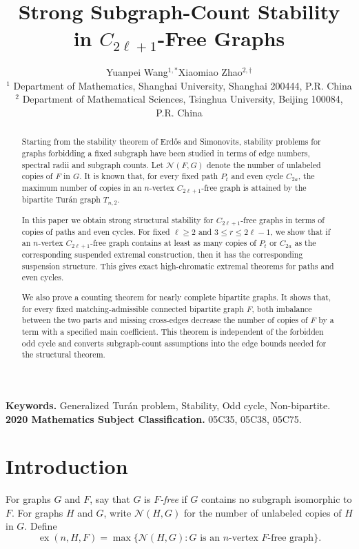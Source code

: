 \documentclass[11pt]{article}
\title{Strong Subgraph-Count Stability in $C_{2\ell+1}$-Free Graphs}
\author{Yuanpei Wang$^{1,*}$\quad Xiaomiao Zhao$^{2,\dagger}$\\[0.5ex]
\small $^1$ Department of Mathematics, Shanghai University, Shanghai 200444, P.R. China\\
\small $^2$ Department of Mathematical Sciences, Tsinghua University, Beijing 100084, P.R. China}
\date{}
\theoremstyle{definition}
\theoremstyle{plain}
\theoremstyle{remark}
\theoremstyle{plain}
\numberwithin{equation}{section}
\DeclareMathOperator{\ex}{ex}
\newcommand{\N}{\mathcal N}
\begin{document}
\maketitle
\begingroup
\renewcommand{\thefootnote}{\fnsymbol{footnote}}
\endgroup

\begin{abstract}
Starting from the stability theorem of Erd\H{o}s and Simonovits, stability problems for graphs forbidding a fixed subgraph have been studied in terms of edge numbers, spectral radii and subgraph counts. Let $\N(F,G)$ denote the number of unlabeled copies of $F$ in $G$. It is known that, for every fixed path $P_t$ and even cycle $C_{2a}$, the maximum number of copies in an $n$-vertex $C_{2\ell+1}$-free graph is attained by the bipartite Tur\'an graph $T_{n,2}$.

In this paper we obtain strong structural stability for $C_{2\ell+1}$-free graphs in terms of copies of paths and even cycles. For fixed $\ell\ge2$ and $3\le r\le2\ell-1$, we show that if an $n$-vertex $C_{2\ell+1}$-free graph contains at least as many copies of $P_t$ or $C_{2a}$ as the corresponding suspended extremal construction, then it has the corresponding suspension structure. This gives exact high-chromatic extremal theorems for paths and even cycles.

We also prove a counting theorem for nearly complete bipartite graphs. It shows that, for every fixed matching-admissible connected bipartite graph $F$, both imbalance between the two parts and missing cross-edges decrease the number of copies of $F$ by a term with a specified main coefficient. This theorem is independent of the forbidden odd cycle and converts subgraph-count assumptions into the edge bounds needed for the structural theorem.
\end{abstract}

\noindent\textbf{Keywords.} Generalized Tur\'an problem, Stability, Odd cycle, Non-bipartite.\\
\textbf{2020 Mathematics Subject Classification.} 05C35, 05C38, 05C75.


\section{Introduction}

For graphs $G$ and $F$, say that $G$ is \emph{$F$-free} if $G$ contains no subgraph isomorphic to $F$. For graphs $H$ and $G$, write $\N(H,G)$ for the number of unlabeled copies of $H$ in $G$. Define
\[
        \ex(n,H,F)=\max\{\N(H,G): G \text{ is an $n$-vertex $F$-free graph}\}.
\]
\end{document}
